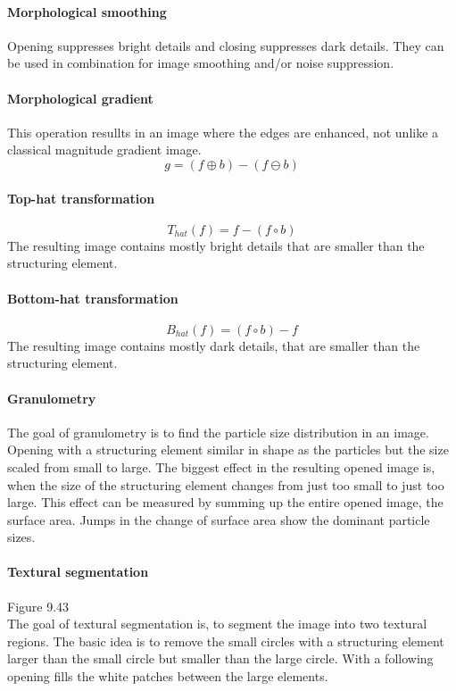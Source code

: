 \paragraph{Morphological smoothing}
Opening suppresses bright details and closing suppresses dark details. They can be used in combination for image smoothing and/or noise suppression.
\paragraph{Morphological gradient}
This operation resullts in an image where the edges are enhanced, not unlike a classical magnitude gradient image.
\[
	g=(f\oplus b)-(f\ominus b)
\]
\paragraph{Top-hat transformation}
\[
	T_{hat}(f) = f -(f \circ b)
\]
The resulting image contains mostly bright details that are smaller than the structuring element.
\paragraph{Bottom-hat transformation}
\[
	B_{hat}(f) = (f \circ b)-f
\]
The resulting image contains mostly dark details, that are smaller than the structuring element.
\paragraph{Granulometry}
The goal of granulometry is to find the particle size distribution in an image. Opening with a structuring element similar in shape as the particles but the size scaled from small to large. The biggest effect in the resulting opened image is, when the size of the structuring element changes from just too small to just too large. This effect can be measured by summing up the entire opened image, the surface area. Jumps in the change of surface area show the dominant particle sizes.
\paragraph{Textural segmentation}
Figure 9.43\\
The goal of textural segmentation is, to segment the image into two textural regions. The basic idea is to remove the small circles with a structuring element larger than the small circle but smaller than the large circle. With a following opening fills the white patches between the large elements.
